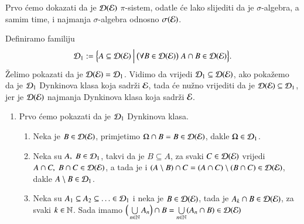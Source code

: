 \begin{rj}[\ref{zad:2.5}]
    Prvo \' cemo dokazati da je $\mathcal{D}({\mathcal{E}})$ $\pi$-sistem, odatle \' ce lako slijediti da je $\sigma$-algebra, a samim time, i najmanja $\sigma$-algebra odnosno $\sigma({\mathcal{E}})$.

    Definiramo familiju
    \begin{equation*}
        \mathcal{D}_1 := \Big\{ {A \subseteq \mathcal{D}({\mathcal{E}})} \: \Big| \: { \big(\forall B \in \mathcal{D}({\mathcal{E}}) \big) \; A \cap B \in \mathcal{D}({\mathcal{E}}) } \Big\}.
    \end{equation*}
    \v Zelimo pokazati da je $\mathcal{D}({\mathcal{E}}) = \mathcal{D}_1$.
    Vidimo da vrijedi $\mathcal{D}_1 \subseteq \mathcal{D}({\mathcal{E}})$, ako poka\v zemo da je $\mathcal{D}_1$ Dynkinova klasa koja sadr\v zi $\mathcal{E}$, tada \' ce nu\v zno vrijediti da je $\mathcal{D}({\mathcal{E}}) \subseteq \mathcal{D}_1$, jer je $\mathcal{D}({\mathcal{E}})$ najmanja Dynkinova klasa koja sadr\v zi $\mathcal{E}$.
    
    \begin{enumerate}[label=(\arabic*)]
        \item \label{rj:2.5a}
        Prvo \' cemo pokazati da je $\mathcal{D}_1$ Dynkinova klasa.
        \begin{enumerate}[label=(\roman*)]
            \item Neka je $B \in \mathcal{D}({\mathcal{E}})$, primjetimo $\Omega \cap B = B \in \mathcal{D}({\mathcal{E}})$, dakle $\Omega \in \mathcal{D}_1$.
            \item Neka su $A, \;B \in \mathcal{D}_1$, takvi da je $B \subseteq A$, za svaki $C \in \mathcal{D}({\mathcal{E}})$ vrijedi $A \cap C, \; B \cap C \in \mathcal{D}({\mathcal{E}})$, a tada je i $(A \setminus B) \cap C = (A \cap C) \setminus (B \cap C) \in \mathcal{D}({\mathcal{E}})$, dakle $A \setminus B \in \mathcal{D}_1$.
            \item Neka su $A_1 \subseteq A_2 \subseteq \ldots \in \mathcal{D}_1$ i neka je $B \in \mathcal{D}({\mathcal{E}})$, tada je $A_k \cap B \in \mathcal{D}({\mathcal{E}})$, za svaki $k \in \mathbb{N}$.
            Sada imamo $\Big(\bigcup\limits_{n \in \mathbb{N}}^{} A_n \Big) \cap B = \bigcup\limits_{n \in \mathbb{N}}^{} (A_n \cap B) \in \mathcal{D}({\mathcal{E}})$
        \end{enumerate}


\end{enumerate}
\end{rj}
